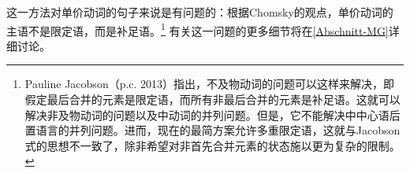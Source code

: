 这一方法对单价动词的句子来说是有问题的：根据Chomsky的观点，单价动词的主语不是限定语，而是补足语。\footnote{%
Pauline Jacobson（p.c. 2013）指出，不及物动词的问题可以这样来解决，即假定最后合并的元素是限定语，而所有非最后合并的元素是补足语。这就可以解决非及物动词的问题以及中动词的并列问题。但是，它不能解决中中心语后置语言的并列问题。进而，现在的最简方案允许多重限定语，这就与Jacobson式的思想不一致了，除非希望对非首先合并元素的状态施以更为复杂的限制。
}
有关这一问题的更多细节将在\ref{Abschnitt-MG}详细讨论。

